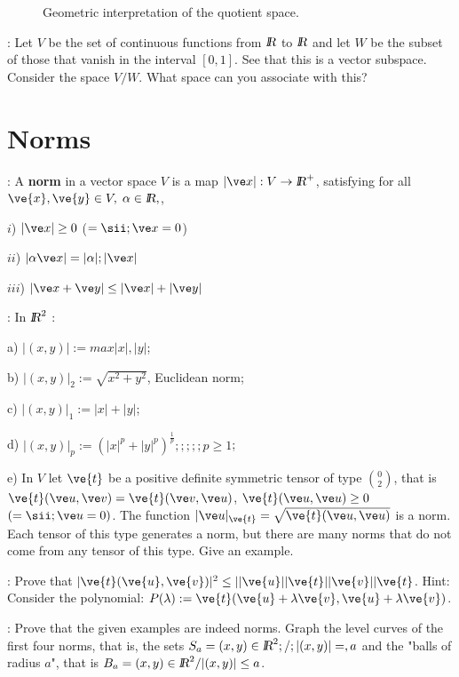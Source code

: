 \begin{figure}[htbp] \begin{center}  \caption{Geometric interpretation of the quotient space.} \label{fig:2_1} \end{center} \end{figure}

\ejer: Let $V$ be the set of continuous functions from $\mbox{\sl {l$\!\!\!\;\:\!$R}}$ to $\mbox{\sl {l$\!\!\!\;\:\!$R}}$ and let $W$ be the subset of those that vanish in the interval $[0,1]$. See that this is a vector subspace. Consider the space $V/W$. What space can you associate with this?

\section{Norms}

: A {\bf norm} in a vector space $V$ is a map $|\ve x|:V\to \re^+$, satisfying for all $\ve{x},\ve{y} \in V,\;\alpha\in \re,$,

$i$) $|\ve x|\geq 0$ \; \; ($=\sii ;\ve x=0$)

$ii$) $|\alpha \ve x| =| \alpha|;|\ve x|$

$iii$) $|\ve x+\ve y|\leq|\ve x|+|\ve y|$

\noi{}: In $\mbox{\sl {l$\!\!\!\;\:\!$R}}^2$ :

\noi a) $|(x,y)|:= max{|x|,|y|}$;

\noi b) $|(x,y)|_{2}:=\sqrt{x^2+y^2}$, Euclidean norm;

\noi c) $|(x,y)|_{1}:=|x| +|y|$;

\noi d) $|(x,y)|_{p}:=(|x|^{p} + |y|^{p})^{\frac{1}{p}} ;;;;; p\geq 1$;

\noi e) In $V$ let $\ve{t}$ be a positive definite symmetric tensor of type ${0 \choose 2}$, that is $\ve{t}(\ve u,\ve v)=\ve{t}(\ve v,\ve u)$, $\ve{t}(\ve u,\ve u)\geq 0$ $(=\sii;\ve u=0)$. The function $|\ve u|_{\ve{t}} =\sqrt{\ve{t}(\ve u,\ve u)}$ is a norm. Each tensor of this type generates a norm, but there are many norms that do not come from any tensor of this type. Give an example.

\ejer: Prove that $|\ve{t}(\ve{u},\ve{v})|^2 \leq ||\ve{u}||{\ve{t}} ||\ve{v}||{\ve{t}}$. Hint: Consider the polynomial: $P(\lambda) := \ve{t}(\ve{u} + \lambda \ve{v},\ve{u} + \lambda \ve{v})$.

\ejer: Prove that the given examples are indeed norms. Graph the level curves of the first four norms, that is, the sets $S_a={(x,y)\in \mbox{\sl {l$\!\!\!\;\:\!$R}}^2;/;|(x,y)|=,a}$ and the "balls of radius $a$", that is $B_a={(x,y)\in \mbox{\sl {l$\!\!\!\;\:\!$R}}^2/|(x,y)|\leq a}$.

